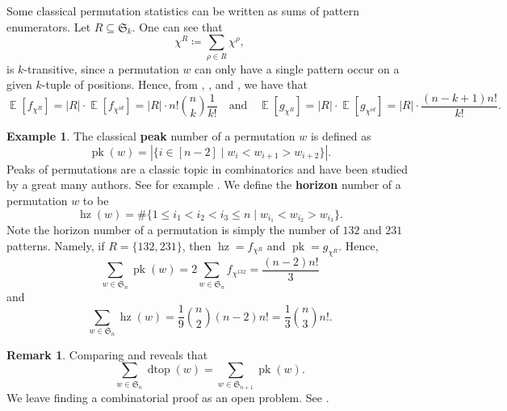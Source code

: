 \documentclass{amsart}
\renewcommand{\S}{\mathfrak{S}}
\DeclareMathOperator{\dtop}{dtop}
\DeclareMathOperator{\E}{\mathbb{E}}
\theoremstyle{definition}
\newtheorem{remark}[theorem]{Remark}
\newtheorem{example}[theorem]{Example}
\begin{document}
    Some classical permutation statistics can be written as sums of pattern enumerators. Let $R\subseteq \S_k$. 
    One can see that 
    \begin{equation}
    \chi^{R}\coloneqq\sum_{\rho\in R} \chi^{\rho},
    \end{equation}
    is $k$-transitive, since a permutation $w$ can only have a single pattern occur on a given $k$-tuple of positions. Hence, from ,  , and  , we have that
   \begin{equation}
        \E[f_{\chi^R}]=|R|\cdot \E[f_{\chi^{id}}]=|R|\cdot n!\binom{n}{k}\frac{1}{k!}\quad\text{and}\quad  \E[g_{\chi^R}]=|R|\cdot\E[g_{\chi^{id}}]=|R|\cdot\frac{(n-k+1)n!}{k!}.
   \end{equation}
   \begin{example}
   The classical \textbf{peak} number of a permutation $w$ is defined as 
 \[\operatorname{pk}(w)=|\{i\in [n-2]\mid w_i<w_{i+1}>w_{i+2}\}|.\]
Peaks of permutations are a classic topic in combinatorics and have been studied by a great many authors. See for example \cite{peak1,peak2,peak3,peak4,peaks10,peaks11,peaks5,peaks6,peaks7,peaks8,peaks9}.
 We define the \textbf{horizon} number of a permutation $w$ to be
 \[\operatorname{hz}(w)=\#\{1\leq i_1<i_2<i_3\leq n\mid w_{i_1}<w_{i_2}>w_{i_3}\}.\]
 Note the horizon number of a permutation is simply the number of $132$ and $231$ patterns. 
 Namely, if $R=\{132,231\}$, then  
 $\operatorname{hz}=f_{\chi^R}$ and $\operatorname{pk}=g_{\chi^R}$. Hence,
 \begin{equation}\label{eq:ttl-num-of-peaks}
 \sum_{w\in \S_n}\operatorname{pk}(w)=2\sum_{w\in \S_n}f_{\chi^{132}}=\frac{(n-2)n!}{3}
 \end{equation}
and 
 \begin{equation}
 \sum_{w\in \S_n}\operatorname{hz}(w)=\frac{1}{9}\binom{n}{2}(n-2)n!=\frac{1}{3}\binom{n}{3}n!.
 \end{equation}
\end{example}
\begin{remark}

Comparing  and  reveals that
    \begin{equation}
        \sum_{w\in \S_n}\dtop(w)=\sum_{w\in \S_{n+1}}\operatorname{pk}(w).
    \end{equation}
   We leave finding a combinatorial proof as an open problem. See .
\end{remark}
\end{document}
